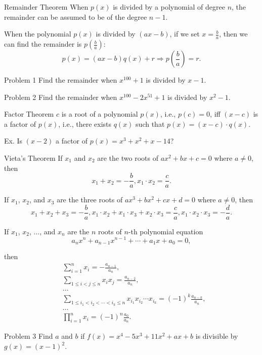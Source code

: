 \documentclass[professionalfont, 12pt, handout, t]{beamer} %
\theoremstyle{plain}
\theoremstyle{definition}
\begin{document}
\begin{frame}{Remainder Theorem}
    When $p(x)$ is divided by a polynomial of degree $n$, the remainder can be assumed to be of the degree $n-1$.\pause


    When the polynomial $p(x)$ is divided by $(ax-b)$, if we set $x = \frac{b}{a}$, then we can find the remainder is $p(\frac{b}{a})$:
    \[
        p(x) = (ax-b)q(x)+r \Rightarrow p(\frac{b}{a}) = r.
    \]
    \pause
\end{frame}

\begin{frame}{Problem 1}
    Find the remainder when $x^{100}+1$ is divided by $x-1$.
\end{frame}

\begin{frame}{Problem 2}
    Find the remainder when $x^{100}-2x^{51}+1$ is divided by $x^2-1$.
\end{frame}

\begin{frame}{Factor Theorem}
    $c$ is a root of a polynomial $p(x)$, i.e., $p(c) = 0$, iff $(x-c)$ is a factor of $p(x)$, i.e., there exists $q(x)$ such that $p(x) = (x-c) \cdot q(x)$.\pause

    Ex. Is $(x-2)$ a factor of $p(x) = x^3+x^2+x-14$?
\end{frame}

\begin{frame}{Vieta's Theorem}
    If $x_1$ and $x_2$ are the two roots of $ax^2+bx+c=0$ where $a \neq 0$, then
    \[
        x_1+x_2 = -\frac{b}{a}, x_1 \cdot x_2 = \frac{c}{a}.
    \]
    \pause
    
    If $x_1$, $x_2$, and $x_3$ are the three roots of $ax^3+bx^2+cx+d=0$ where $a \neq 0$, then
    \[
        x_1+x_2+x_3 = -\frac{b}{a}, x_1 \cdot x_2 + x_1 \cdot x_3 + x_2 \cdot x_3 = \frac{c}{a}, x_1 \cdot x_2 \cdot x_3 = -\frac{d}{a}.
    \]
    \pause

\end{frame}

\begin{frame}{}
    If $x_1$, $x_2$, $\dots$, and $x_n$ are the $n$ roots of $n$-th polynomial equation
    \[
        a_n x^n + a_{n-1} x^{n-1} + \cdots + a_1 x + a_0 = 0,
    \]

    then
    \begin{align*}
        & \sum_{i=1}^n x_i = -\frac{a_{n-1}}{a_n},\\
        & \sum_{1 \leq i < j \leq n} x_i x_j = \frac{a_{n-2}}{a_n},\\
        & \dots\\
        & \sum_{1 \leq i_1 < i_2 < \cdots < i_k \leq n} x_{i_1} x_{i_2} \cdots x_{i_k} = (-1)^k \frac{a_{n-k}}{a_n},\\
        & \dots\\
        & \prod_{i=1}^n x_i = (-1)^n \frac{a_0}{a_n}.
    \end{align*}
\end{frame}

\begin{frame}{Problem 3}
    Find $a$ and $b$ if $f(x) = x^4-5x^3+11x^2+ax+b$ is divisible by $g(x) = (x-1)^2$.
\end{frame}
\end{document}
